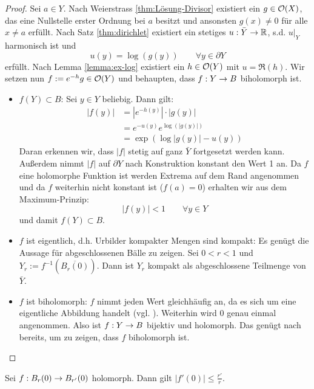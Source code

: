 \begin{proof}
  Sei $a \in Y$. Nach Weierstrass \ref{thm:Lösung-Divisor} existiert ein $g \in
  \mathcal{O}(X)$, das eine Nullstelle erster Ordnung bei $a$ besitzt und
  ansonsten $g(x) \neq 0$ für alle $x \neq a$ erfüllt. 
  Nach Satz \ref{thm:dirichlet} existiert ein stetiges $u: \bar Y \rightarrow
  \mathbb{R}$, s.d. $u|_Y$ harmonisch ist und
  \[
  u(y) = \log(g(y)) \qquad \forall y \in \partial Y
  \]
  erfüllt. 
  Nach Lemma \ref{lemma:ex-log} existiert ein $h \in \mathcal{O}(Y)$ mit $u =
  \Re(h)$. 
  Wir setzen nun $f := e^{-h} g \in \mathcal{O}(Y)$ und behaupten, dass $f: Y \rightarrow
  B$ biholomorph ist.
  \begin{itemize}
  \item $f(Y) \subset B$: Sei $y \in Y$ beliebig. Dann gilt:
    \begin{align*}
      |f(y)| & = | e^{-h(y)} | \cdot | g(y)| \\
      & = e^{-u(y)} e^{\log(|g(y)|)} \\
      & = \exp(\log|g(y)| - u(y))
    \end{align*}
    Daran erkennen wir, dass $|f|$ stetig auf ganz $\bar Y$ fortgesetzt werden
    kann. Außerdem nimmt $|f|$ auf $\partial Y$ nach Konstruktion konstant den Wert 1 an. Da
    $f$ eine holomorphe Funktion ist werden Extrema auf dem Rand
    angenommen und da $f$ weiterhin nicht konstant ist ($f(a) = 0$)
    erhalten wir aus dem Maximum-Prinzip:
    \[
    |f(y)| < 1 \qquad \forall y \in Y
    \]
    und damit $f(Y) \subset B$.
  \item $f$ ist eigentlich, d.h. Urbilder kompakter Mengen sind
    kompakt: Es genügt die Aussage für abgeschlossenen Bälle zu
    zeigen. Sei $0 < r < 1$ und $Y_r := f^{-1}(\overline{B_r(0)})$. 
    Dann ist $Y_r$ kompakt als abgeschlossene Teilmenge von $\bar Y$.
  \item $f$ ist biholomorph: $f$ nimmt jeden Wert gleichhäufig an, da
    es sich um eine eigentliche Abbildung handelt (vgl. \cite[Satz 4.24]{For}). Weiterhin wird $0$
    genau einmal angenommen. Also ist $f: Y \rightarrow B$ bijektiv und
    holomorph. Das genügt nach \cite[Kor. 2.5]{For} bereits, um zu zeigen, dass $f$ biholomorph
    ist.

  \end{itemize}

\end{proof}

\begin{prop}
  \label{prop:kreis}
  Sei $f: B_r(0) \rightarrow B_{r'}(0)$ holomorph. Dann gilt $|f'(0)| \leq \frac{r'}{r}$.
\end{prop}

